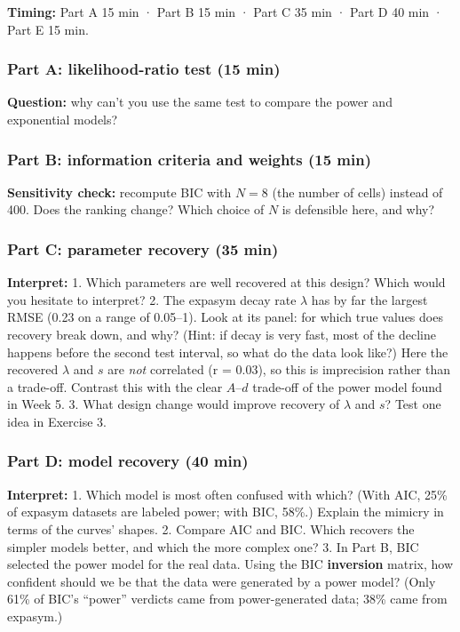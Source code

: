 \textbf{Timing:} Part A 15 min · Part B 15 min · Part C 35 min · Part D
40 min · Part E 15 min.

\subsubsection{Part A: likelihood-ratio test (15 min)}

\textbf{Question:} why can't you use the same test to compare the power
and exponential models?

\subsubsection{Part B: information criteria and weights (15 min)}

\textbf{Sensitivity check:} recompute BIC with \(N = 8\) (the number of
cells) instead of 400. Does the ranking change? Which choice of \(N\) is
defensible here, and why?

\subsubsection{Part C: parameter recovery (35 min)}

\textbf{Interpret:} 1. Which parameters are well recovered at this
design? Which would you hesitate to interpret? 2. The expasym decay rate
\(\lambda\) has by far the largest RMSE (0.23 on a range of 0.05--1).
Look at its panel: for which true values does recovery break down, and
why? (Hint: if decay is very fast, most of the decline happens before
the second test interval, so what do the data look like?) Here the
recovered \(\lambda\) and \(s\) are \emph{not} correlated (r = 0.03), so
this is imprecision rather than a trade-off. Contrast this with the
clear \(A\)--\(d\) trade-off of the power model found in Week 5. 3. What
design change would improve recovery of \(\lambda\) and \(s\)? Test one
idea in Exercise 3.

\subsubsection{Part D: model recovery (40 min)}

\textbf{Interpret:} 1. Which model is most often confused with which?
(With AIC, 25\% of expasym datasets are labeled power; with BIC, 58\%.)
Explain the mimicry in terms of the curves' shapes. 2. Compare AIC and
BIC. Which recovers the simpler models better, and which the more
complex one? 3. In Part B, BIC selected the power model for the real
data. Using the BIC \textbf{inversion} matrix, how confident should we
be that the data were generated by a power model? (Only 61\% of BIC's
``power'' verdicts came from power-generated data; 38\% came from
expasym.)

